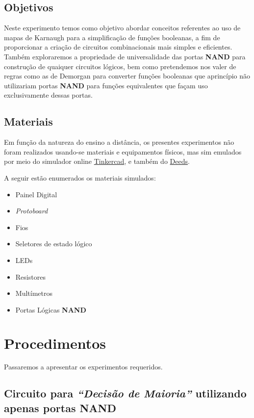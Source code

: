 \documentclass[12pt]{article}
\begin{document}
\subsection{Objetivos}
\label{sec:Objetivos}
Neste experimento temos como objetivo abordar conceitos referentes ao uso de
mapas de Karnaugh para a simplificação de funções booleanas, a fim de
proporcionar a criação de circuitos combinacionais mais simples e eficientes.
Também exploraremos a propriedade de universalidade das portas \textbf{NAND}
para construção de quaiquer circuitos lógicos, bem como pretendemos nos valer de
regras como as de Demorgan para converter funções booleanas que aprincípio não
utilizariam portas \textbf{NAND} para funções equivalentes que façam uso
exclusivamente dessas portas.

\subsection{Materiais}
\label{sec:Materiais}
Em função da natureza do ensino a distância, os presentes experimentos não foram
realizados usando-se materiais e equipamentos físicos, mas sim emulados por meio
do simulador online \href{https://www.tinkercad.com/}{Tinkercad}, e também do
\href{https://www.digitalelectronicsdeeds.com/deeds.html}{Deeds}.

A seguir estão enumerados os materiais simulados:
\begin{itemize}
    \item Painel Digital
    \item \textit{Protoboard}
    \item Fios
    \item Seletores de estado lógico
    \item LEDs
    \item Resistores
    \item Multímetros
    \item Portas Lógicas \textbf{NAND}
\end{itemize}

\section{Procedimentos}
\label{sec:Procedimentos}

Passaremos a apresentar os experimentos requeridos.

\subsection{Circuito para \textit{``Decisão de Maioria''} utilizando apenas portas \textbf{NAND}}\label{sec:decisao_maioria}
\end{document}
